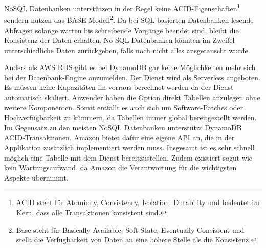 NoSQL Datenbanken unterstützen in der Regel keine ACID-Eigenschaften\footnote{ACID steht für Atomicity, Consistency, Isolation, Durability und bedeutet im Kern, dass
alle Transaktionen konsistent sind.} sondern nutzen das BASE-Modell\footnote{Base steht für Basically Available, Soft State, Eventually Consistent und
stellt die Verfügbarkeit von Daten an eine höhere Stelle als die Konsistenz.}.
Da bei SQL-basierten Datenbanken lesende Abfragen solange warten bis schreibende Vorgänge beendet sind, bleibt die Konsistenz der Daten erhalten.
No-SQL Datenbanken könnten im Zweifel unterschiedliche Daten zurückgeben, falls noch nicht alles ausgetauscht wurde. \cite[]{Datenbankvergleich}

Anders als AWS RDS gibt es bei DynamoDB gar keine Möglichkeiten mehr sich bei der Datenbank-Engine anzumelden. Der Dienst wird als Serverless angeboten.
Es müssen keine Kapazitäten im vorraus berechnet werden da der Dienst automatisch skaliert. Anwender haben die Option direkt Tabellen anzulegen ohne weitere
Komponenten. Somit entfällt es auch sich um Software-Patches oder Hochverfügbarkeit zu kümmern, da Tabellen immer global bereitgestellt werden.
Im Gegensatz zu den meisten NoSQL Datenbanken unterstützt DynamoDB ACID-Transaktionen. Amazon bietet dafür eine eigene API an, die in der Applikation zusätzlich
implementiert werden muss. Insgesamt ist es sehr schnell möglich eine Tabelle mit dem Dienst bereitzustellen. Zudem existiert sogut wie kein Wartungsaufwand,
da Amazon die Verantwortung für die wichtigsten Aspekte übernimmt.\cite[]{DynamoDB}

